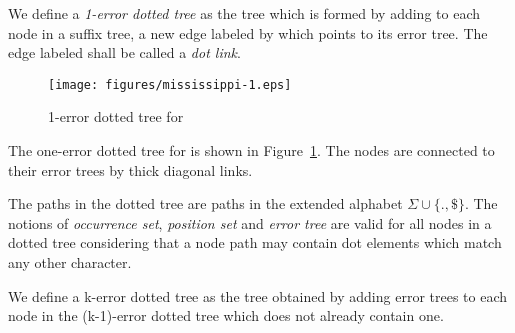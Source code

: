 \begin{definition}
We define a \emph{1-error dotted tree} as the tree which is formed by adding to each node in a suffix tree, a new edge labeled by  which points to its error tree. The edge labeled  shall be called a \emph{dot link}.
\end{definition}

\begin{figure} 
\texttt{[image: figures/mississippi-1.eps]}
\caption{1-error dotted tree for }%
\label{fig:mississippi-1}
\end{figure}


The one-error dotted tree for  is shown in Figure~\ref{fig:mississippi-1}. The nodes are connected to their error trees by thick diagonal links.

The paths in the dotted tree are paths in the extended alphabet $\Sigma\cup\{.,\$\}$. The notions of \emph{occurrence set}, \emph{position set} and \emph{error tree} are valid for all nodes in a dotted tree considering that a node path may contain dot elements which match any other character.

\begin{definition}
We define a k-error dotted tree as the tree obtained by adding error trees to each node in the (k-1)-error dotted tree which does not already contain one.
\end{definition}

